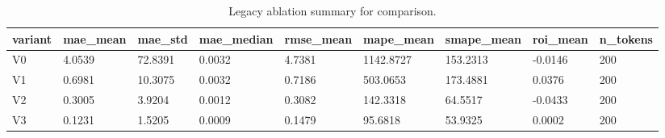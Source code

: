 \begin{table}[htbp]
\centering
\begin{tabular}{lllllllll}
\hline
variant & mae_mean & mae_std & mae_median & rmse_mean & mape_mean & smape_mean & roi_mean & n_tokens \\
\hline
V0 & 4.0539 & 72.8391 & 0.0032 & 4.7381 & 1142.8727 & 153.2313 & -0.0146 & 200 \\
V1 & 0.6981 & 10.3075 & 0.0032 & 0.7186 & 503.0653 & 173.4881 & 0.0376 & 200 \\
V2 & 0.3005 & 3.9204 & 0.0012 & 0.3082 & 142.3318 & 64.5517 & -0.0433 & 200 \\
V3 & 0.1231 & 1.5205 & 0.0009 & 0.1479 & 95.6818 & 53.9325 & 0.0002 & 200 \\
\hline
\end{tabular}
\caption{Legacy ablation summary for comparison.}
\label{table_ablation_sequential_legacy}
\end{table}